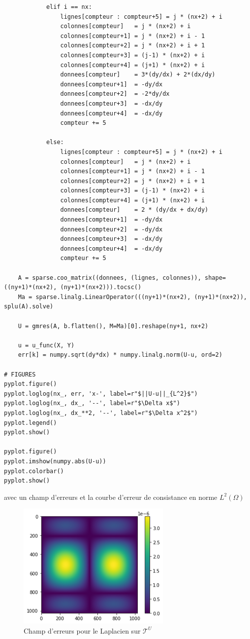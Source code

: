 \begin{verbatim}
            elif i == nx:
                lignes[compteur : compteur+5] = j * (nx+2) + i
                colonnes[compteur]   = j * (nx+2) + i
                colonnes[compteur+1] = j * (nx+2) + i - 1
                colonnes[compteur+2] = j * (nx+2) + i + 1
                colonnes[compteur+3] = (j-1) * (nx+2) + i
                colonnes[compteur+4] = (j+1) * (nx+2) + i
                donnees[compteur]    = 3*(dy/dx) + 2*(dx/dy)
                donnees[compteur+1]  = -dy/dx
                donnees[compteur+2]  = -2*dy/dx
                donnees[compteur+3]  = -dx/dy
                donnees[compteur+4]  = -dx/dy
                compteur += 5

            else:
                lignes[compteur : compteur+5] = j * (nx+2) + i
                colonnes[compteur]   = j * (nx+2) + i
                colonnes[compteur+1] = j * (nx+2) + i - 1
                colonnes[compteur+2] = j * (nx+2) + i + 1
                colonnes[compteur+3] = (j-1) * (nx+2) + i
                colonnes[compteur+4] = (j+1) * (nx+2) + i
                donnees[compteur]    = 2 * (dy/dx + dx/dy)
                donnees[compteur+1]  = -dy/dx
                donnees[compteur+2]  = -dy/dx
                donnees[compteur+3]  = -dx/dy
                donnees[compteur+4]  = -dx/dy
                compteur += 5

    A = sparse.coo_matrix((donnees, (lignes, colonnes)), shape=((ny+1)*(nx+2), (ny+1)*(nx+2))).tocsc()
    Ma = sparse.linalg.LinearOperator(((ny+1)*(nx+2), (ny+1)*(nx+2)), splu(A).solve)
    
    U = gmres(A, b.flatten(), M=Ma)[0].reshape(ny+1, nx+2)
    
    u = u_func(X, Y)
    err[k] = numpy.sqrt(dy*dx) * numpy.linalg.norm(U-u, ord=2)

# FIGURES
pyplot.figure()
pyplot.loglog(nx_, err, 'x-', label=r"$||U-u||_{L^2}$")
pyplot.loglog(nx_, dx_, '--', label=r"$\Delta x$")
pyplot.loglog(nx_, dx_**2, '--', label=r"$\Delta x^2$")
pyplot.legend()
pyplot.show()

pyplot.figure()
pyplot.imshow(numpy.abs(U-u))
pyplot.colorbar()
pyplot.show()
\end{verbatim}
avec un champ d'erreurs et la courbe d'erreur de consistance en norme $L^2(\Omega)$

\begin{figure}[htp]
    \centering
    \includegraphics[width=7.5cm]{Images/stokes/Laplace Dirichlet 2D (U)/erreur.png}
    \caption{Champ d'erreurs pour le Laplacien sur $\mathcal{T}^U$}
\end{figure}

